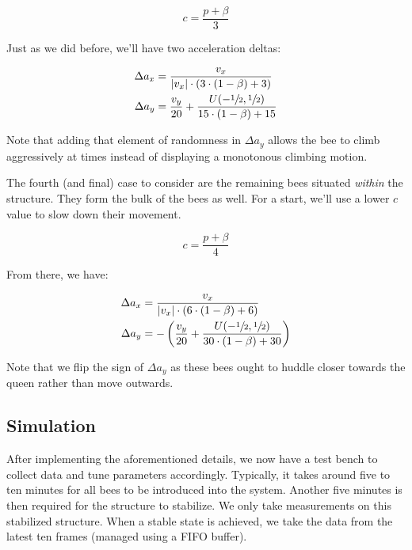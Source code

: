 \documentclass[a4paper,11pt]{article}
\begin{document}
\begin{equation}
    c = \frac{p + \beta}{3}
\end{equation}

Just as we did before, we'll have two acceleration deltas:

\begin{equation}
    \begin{split}
        \Delta a_{x} &= \frac{v_{x}}{|v_{x}| \cdot (3 \cdot  (1-\beta) + 3)} \\
        \Delta a_{y} &= \frac{v_{y}}{20} + \frac{U(-\sfrac{1}{2}, \sfrac{1}{2})}{15 \cdot (1-\beta) + 15}
    \end{split}
\end{equation}

Note that adding that element of randomness in $\Delta a_{y}$ allows the bee
to climb aggressively at times instead of displaying a monotonous climbing motion.

The fourth (and final) case to consider are the remaining bees situated \textit{within}
the structure. They form the bulk of the bees as well. For a start, we'll use a lower
$c$ value to slow down their movement.

\begin{equation}
    c = \frac{p + \beta}{4}
\end{equation}

From there, we have:

\begin{equation}
    \begin{split}
        \Delta a_{x} &= \frac{v_{x}}{|v_{x}| \cdot (6 \cdot  (1-\beta) + 6)} \\
        \Delta a_{y} &= -\left(\frac{v_{y}}{20} + \frac{U(-\sfrac{1}{2}, \sfrac{1}{2})}{30 \cdot (1-\beta) + 30}\right)
    \end{split}
\end{equation}

Note that we flip the sign of $\Delta a_{y}$ as these bees ought to huddle closer towards
the queen rather than move outwards.

\subsection{Simulation}

After implementing the aforementioned details, we now have a test bench to collect
data and tune parameters accordingly. Typically, it takes around five to ten minutes
for all bees to be introduced into the system. Another five minutes is then required
for the structure to stabilize. We only take measurements on this stabilized structure.
When a stable state is achieved, we take the data from the latest ten frames (managed using a FIFO buffer).
\end{document}
